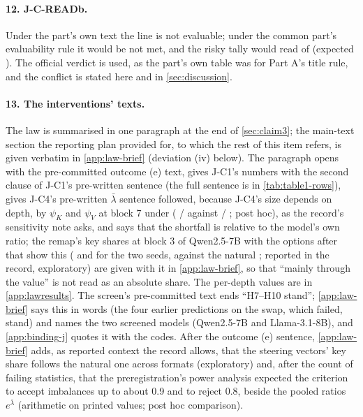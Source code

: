 \paragraph{12. J-C-READb.} Under the part's own text the line is not evaluable; under the common part's evaluability rule it would be not met, and the risky tally would read \JxRiskyMetABCDAlt{} of \JxRiskyVerdABCDAlt{} (expected \JxRiskyExpABCDAlt{}). The official verdict is used, as the part's own table was for Part A's title rule, and the conflict is stated here and in \cref{sec:discussion}.

\paragraph{13. The interventions' texts.} The law is summarised in one paragraph at the end of \cref{sec:claim3}; the main-text section the reporting plan provided for, to which the rest of this item refers, is given verbatim in \cref{app:law-brief} (deviation (iv) below). The paragraph opens with the pre-committed outcome (e) text, gives J-C1's numbers with the second clause of J-C1's pre-written sentence (the full sentence is in \cref{tab:table1-rows}), gives J-C4's pre-written $\bar\lambda$ sentence followed, because J-C4's size depends on depth, by $\psi_K$ and $\psi_V$ at block 7 under \fmtPost{} (\JcFourPsiKWpostSevenQwenSeven{} / \JcFourPsiKWpostSevenMistralSeven{} against \JcFourPsiVWpostSevenQwenSeven{} / \JcFourPsiVWpostSevenMistralSeven{}; post hoc), as the record's sensitivity note asks, and says that the shortfall is relative to the model's own ratio; the remap's key shares at block 3 of Qwen2.5-7B with the options after that show this (\JcKappaEfouraOptThreeQwenSeven{} and \JcKappaEfourbOptThreeQwenSeven{} for the two seeds, against the natural \JcSigmaOptThreeQwenSeven{}; reported in the record, exploratory) are given with it in \cref{app:law-brief}, so that ``mainly through the value'' is not read as an absolute share. The per-depth values are in \cref{app:lawresults}. The screen's pre-committed text ends ``H7--H10 stand''; \cref{app:law-brief} says this in words (the four earlier predictions on the swap, which failed, stand) and names the two screened models (Qwen2.5-7B and Llama-3.1-8B), and \cref{app:binding-j} quotes it with the codes. After the outcome (e) sentence, \cref{app:law-brief} adds, as reported context the record allows, that the steering vectors' key share follows the natural one across formats (exploratory) and, after the count of failing statistics, that the preregistration's power analysis expected the criterion to accept imbalances up to about 0.9 and to reject 0.8, beside the pooled ratios $e^{\bar\lambda}$ (arithmetic on printed values; post hoc comparison).

